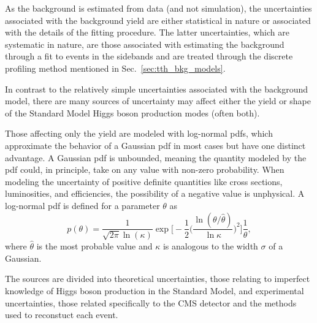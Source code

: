 As the background is estimated from data (and not simulation), the uncertainties associated with the background yield are either statistical in nature or associated with the details of the fitting procedure.
The latter uncertainties, which are systematic in nature, are those associated with estimating the background through a fit to events in the \mgg sidebands and are treated through the discrete profiling method mentioned in Sec.~\ref{sec:tth_bkg_models}.

In contrast to the relatively simple uncertainties associated with the background model, there are many sources of uncertainty may affect either the yield or \mgg shape of the Standard Model Higgs boson production modes (often both).

Those affecting only the yield are modeled with log-normal pdfs, which approximate the behavior of a Gaussian pdf in most cases but have one distinct advantage.
A Gaussian pdf is unbounded, meaning the quantity modeled by the pdf could, in principle, take on any value with non-zero probability.
When modeling the uncertainty of positive definite quantities like cross sections, luminosities, and efficiencies, the possibility of a negative value is unphysical.
A log-normal pdf is defined for a parameter $\theta$ as
\begin{equation}
    p(\theta) = \frac{1}{\sqrt{2\pi} \ln(\kappa)} \exp \bigg[ -\frac{1}{2} \bigg(\frac{\ln(\theta/\hat{\theta})}{ \ln\kappa} \bigg)^2 \bigg] \frac{1}{\theta},
\end{equation}
where $\hat{\theta}$ is the most probable value and $\kappa$ is analogous to the width $\sigma$ of a Gaussian.


The sources are divided into theoretical uncertainties, those relating to imperfect knowledge of Higgs boson production in the Standard Model, and experimental uncertainties, those related specifically to the CMS detector and the methods used to reconstuct each event.

